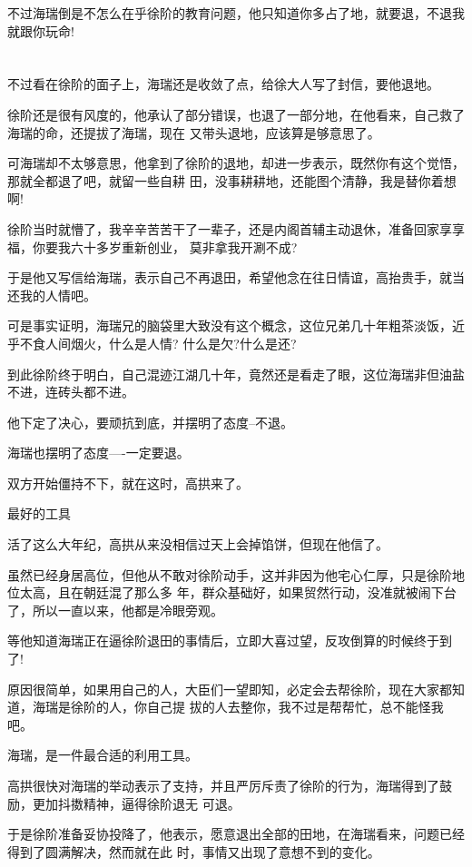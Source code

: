 \documentclass[11pt,a4paper,onecolumn]{article}
\begin{document}
不过海瑞倒是不怎么在乎徐阶的教育问题，他只知道你多占了地，就要退，不退我就跟你玩命!

\section[\thesection]{}

不过看在徐阶的面子上，海瑞还是收敛了点，给徐大人写了封信，要他退地。

徐阶还是很有风度的，他承认了部分错误，也退了一部分地，在他看来，自己救了海瑞的命，还提拔了海瑞，现在
又带头退地，应该算是够意思了。

可海瑞却不太够意思，他拿到了徐阶的退地，却进一步表示，既然你有这个觉悟，那就全都退了吧，就留一些自耕
田，没事耕耕地，还能图个清静，我是替你着想啊!

徐阶当时就懵了，我辛辛苦苦干了一辈子，还是内阁首辅主动退休，准备回家享享福，你要我六十多岁重新创业，
莫非拿我开涮不成?

于是他又写信给海瑞，表示自己不再退田，希望他念在往日情谊，高抬贵手，就当还我的人情吧。

可是事实证明，海瑞兄的脑袋里大致没有这个概念，这位兄弟几十年粗茶淡饭，近乎不食人间烟火，什么是人情?
什么是欠?什么是还?

到此徐阶终于明白，自己混迹江湖几十年，竟然还是看走了眼，这位海瑞非但油盐不进，连砖头都不进。

他下定了决心，要顽抗到底，并摆明了态度--不退。

海瑞也摆明了态度----一定要退。

双方开始僵持不下，就在这时，高拱来了。

最好的工具

活了这么大年纪，高拱从来没相信过天上会掉馅饼，但现在他信了。

虽然已经身居高位，但他从不敢对徐阶动手，这并非因为他宅心仁厚，只是徐阶地位太高，且在朝廷混了那么多
年，群众基础好，如果贸然行动，没准就被闹下台了，所以一直以来，他都是冷眼旁观。

等他知道海瑞正在逼徐阶退田的事情后，立即大喜过望，反攻倒算的时候终于到了!

原因很简单，如果用自己的人，大臣们一望即知，必定会去帮徐阶，现在大家都知道，海瑞是徐阶的人，你自己提
拔的人去整你，我不过是帮帮忙，总不能怪我吧。

海瑞，是一件最合适的利用工具。

高拱很快对海瑞的举动表示了支持，并且严厉斥责了徐阶的行为，海瑞得到了鼓励，更加抖擞精神，逼得徐阶退无
可退。

于是徐阶准备妥协投降了，他表示，愿意退出全部的田地，在海瑞看来，问题已经得到了圆满解决，然而就在此
时，事情又出现了意想不到的变化。
\end{document}
